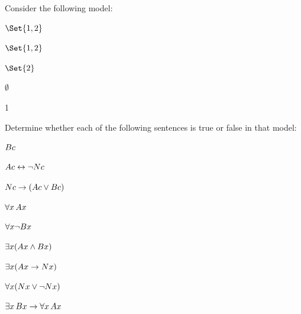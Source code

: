 \begin{practiceproblems}
	\problempart
	\label{pr:TorF1}
	Consider the following model:
	\begin{interp}
		\item[\domain] $\Set{1,2}$
		\item[\denote{A}] $\Set{1,2}$
		\item[\denote{B}] $\Set{2}$
		\item[\denote{N}] $\emptyset$
		\item[\denote{c}] 1
	\end{interp}
	Determine whether each of the following sentences is true or false in that model:
	\begin{problemslist}
		\item $\mathord{B}c$ \hfill {}
		\item $\mathord{A}c \leftrightarrow \neg \mathord{N}c$ \hfill {}
		\item $\mathord{N}c \rightarrow (\mathord{A}c \vee \mathord{B}c)$ \hfill {}
		\item $\forall x\,\mathord{A}x$ \hfill {}
		\item $\forall x \neg \mathord{B}x$ \hfill {}
		\item $\exists x(\mathord{A}x \mathbin{\wedge} \mathord{B}x)$ \hfill {}
		\item $\exists x(\mathord{A}x \rightarrow \mathord{N}x)$ \hfill {}
		\item $\forall x(\mathord{N}x \vee \neg \mathord{N}x)$ \hfill {}
		\item $\exists x\,\mathord{B}x \rightarrow \forall x\,\mathord{A}x$ \hfill {}
	\end{problemslist}
	

\end{practiceproblems}
